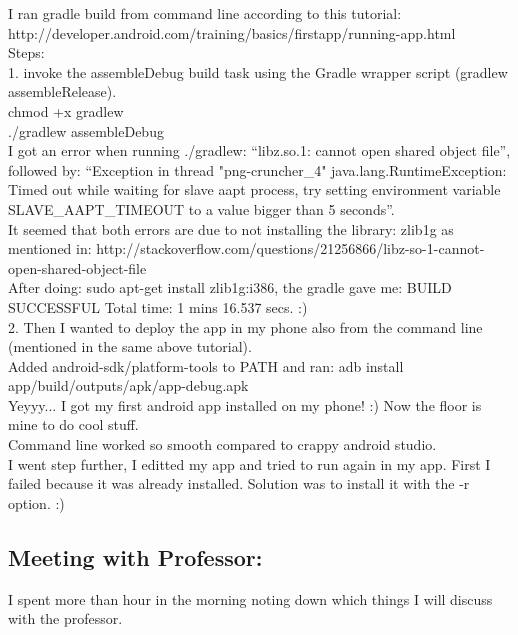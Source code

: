 \documentclass[11pt]{article}
\begin{document}
I ran gradle build from command line according to this tutorial: http://developer.android.com/training/basics/firstapp/running-app.html\\
Steps: \\
1. invoke the assembleDebug build task using the Gradle wrapper script (gradlew assembleRelease).\\
chmod +x gradlew\\
./gradlew assembleDebug\\

I got an error when running ./gradlew: ``libz.so.1: cannot open shared object file'', followed by: ``Exception in thread "png-cruncher_4" 
java.lang.RuntimeException: Timed out while waiting for slave aapt process, try setting environment variable SLAVE\_AAPT\_TIMEOUT to a value bigger 
than 5 seconds''.\\
It seemed that both errors are due to not installing the library: zlib1g as mentioned in: 
http://stackoverflow.com/questions/21256866/libz-so-1-cannot-open-shared-object-file\\
After doing: sudo apt-get install zlib1g:i386, the gradle gave me: BUILD SUCCESSFUL Total time: 1 mins 16.537 secs. :)\\

2. Then I wanted to deploy the app in my phone also from the command line (mentioned in the same above tutorial).\\
Added android-sdk/platform-tools to PATH and ran: adb install app/build/outputs/apk/app-debug.apk\\
Yeyyy... I got my first android app installed on my phone! :) Now the floor is mine to do cool stuff.\\

Command line worked so smooth compared to crappy android studio. \\

I went step further, I editted my app and tried to run again in my app. First I failed because it was already installed. Solution was to install it 
with the -r option. :)

\subsection*{Meeting with Professor:}
I spent more than hour in the morning noting down which things I will discuss with the professor.
\end{document}
